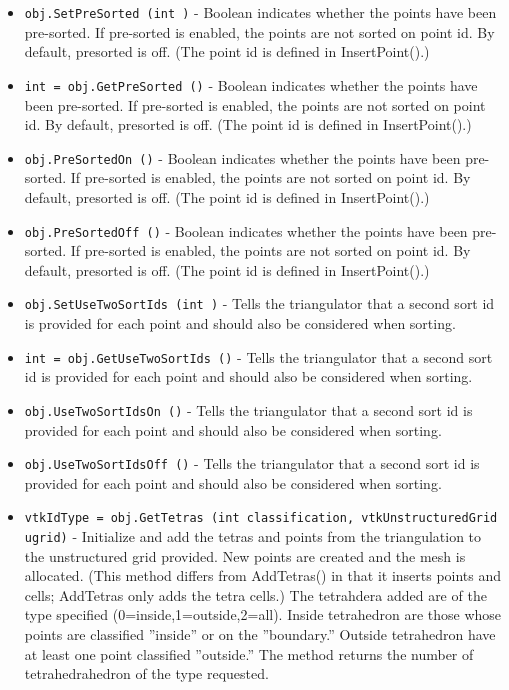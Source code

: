 \begin{itemize}
\item  \verb|obj.SetPreSorted (int )| -  Boolean indicates whether the points have been pre-sorted. If 
 pre-sorted is enabled, the points are not sorted on point id.
 By default, presorted is off. (The point id is defined in
 InsertPoint().)

\item  \verb|int = obj.GetPreSorted ()| -  Boolean indicates whether the points have been pre-sorted. If 
 pre-sorted is enabled, the points are not sorted on point id.
 By default, presorted is off. (The point id is defined in
 InsertPoint().)

\item  \verb|obj.PreSortedOn ()| -  Boolean indicates whether the points have been pre-sorted. If 
 pre-sorted is enabled, the points are not sorted on point id.
 By default, presorted is off. (The point id is defined in
 InsertPoint().)

\item  \verb|obj.PreSortedOff ()| -  Boolean indicates whether the points have been pre-sorted. If 
 pre-sorted is enabled, the points are not sorted on point id.
 By default, presorted is off. (The point id is defined in
 InsertPoint().)

\item  \verb|obj.SetUseTwoSortIds (int )| -  Tells the triangulator that a second sort id is provided
 for each point and should also be considered when sorting.

\item  \verb|int = obj.GetUseTwoSortIds ()| -  Tells the triangulator that a second sort id is provided
 for each point and should also be considered when sorting.

\item  \verb|obj.UseTwoSortIdsOn ()| -  Tells the triangulator that a second sort id is provided
 for each point and should also be considered when sorting.

\item  \verb|obj.UseTwoSortIdsOff ()| -  Tells the triangulator that a second sort id is provided
 for each point and should also be considered when sorting.

\item  \verb|vtkIdType = obj.GetTetras (int classification, vtkUnstructuredGrid ugrid)| -  Initialize and add the tetras and points from the triangulation to the
 unstructured grid provided.  New points are created and the mesh is
 allocated. (This method differs from AddTetras() in that it inserts
 points and cells; AddTetras only adds the tetra cells.) The tetrahdera
 added are of the type specified (0=inside,1=outside,2=all). Inside
 tetrahedron are those whose points are classified ''inside'' or on the
 ''boundary.''  Outside tetrahedron have at least one point classified
 ''outside.''  The method returns the number of tetrahedrahedron of the
 type requested.


\end{itemize}
